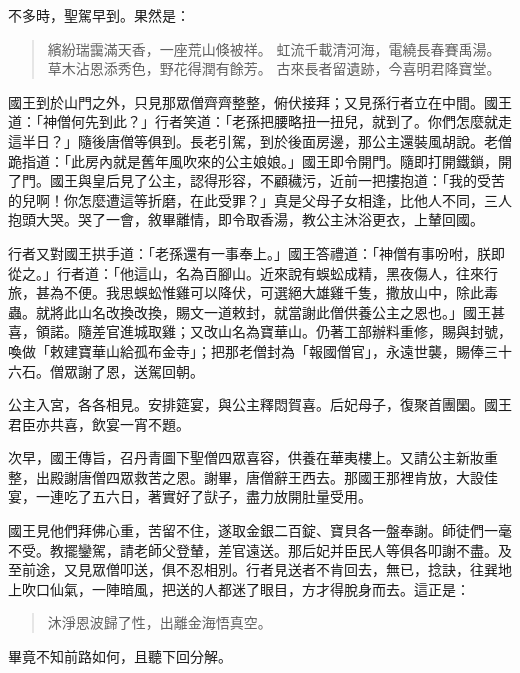 不多時，聖駕早到。果然是：
\begin{quote}
繽紛瑞靄滿天香，一座荒山倏被祥。
虹流千載清河海，電繞長春賽禹湯。
草木沾恩添秀色，野花得潤有餘芳。
古來長者留遺跡，今喜明君降寶堂。
\end{quote}

國王到於山門之外，只見那眾僧齊齊整整，俯伏接拜；又見孫行者立在中間。國王道：「神僧何先到此？」行者笑道：「老孫把腰略扭一扭兒，就到了。你們怎麼就走這半日？」隨後唐僧等俱到。長老引駕，到於後面房邊，那公主還裝風胡說。老僧跪指道：「此房內就是舊年風吹來的公主娘娘。」國王即令開門。隨即打開鐵鎖，開了門。國王與皇后見了公主，認得形容，不顧穢污，近前一把摟抱道：「我的受苦的兒啊！你怎麼遭這等折磨，在此受罪？」真是父母子女相逢，比他人不同，三人抱頭大哭。哭了一會，敘畢離情，即令取香湯，教公主沐浴更衣，上輦回國。

行者又對國王拱手道：「老孫還有一事奉上。」國王答禮道：「神僧有事吩咐，朕即從之。」行者道：「他這山，名為百腳山。近來說有蜈蚣成精，黑夜傷人，往來行旅，甚為不便。我思蜈蚣惟雞可以降伏，可選絕大雄雞千隻，撒放山中，除此毒蟲。就將此山名改換改換，賜文一道敕封，就當謝此僧供養公主之恩也。」國王甚喜，領諾。隨差官進城取雞；又改山名為寶華山。仍著工部辦料重修，賜與封號，喚做「敕建寶華山給孤布金寺」；把那老僧封為「報國僧官」，永遠世襲，賜俸三十六石。僧眾謝了恩，送駕回朝。

公主入宮，各各相見。安排筵宴，與公主釋悶賀喜。后妃母子，復聚首團圞。國王君臣亦共喜，飲宴一宵不題。

次早，國王傳旨，召丹青圖下聖僧四眾喜容，供養在華夷樓上。又請公主新妝重整，出殿謝唐僧四眾救苦之恩。謝畢，唐僧辭王西去。那國王那裡肯放，大設佳宴，一連吃了五六日，著實好了獃子，盡力放開肚量受用。

國王見他們拜佛心重，苦留不住，遂取金銀二百錠、寶貝各一盤奉謝。師徒們一毫不受。教擺鑾駕，請老師父登輦，差官遠送。那后妃并臣民人等俱各叩謝不盡。及至前途，又見眾僧叩送，俱不忍相別。行者見送者不肯回去，無已，捻訣，往巽地上吹口仙氣，一陣暗風，把送的人都迷了眼目，方才得脫身而去。這正是：
\begin{quote}
沐淨恩波歸了性，出離金海悟真空。
\end{quote}

畢竟不知前路如何，且聽下回分解。
